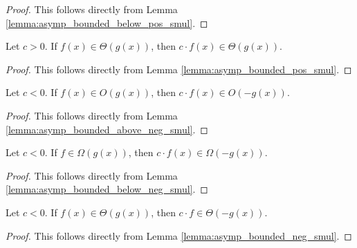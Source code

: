 \begin{proof}
    \leanok
    This follows directly from Lemma \ref{lemma:asymp_bounded_below_pos_smul}.
\end{proof}

\begin{lemma}
    \label{lemma:theta_pos_smul}
    \leanok
    Let $c > 0$. If $f(x) \in \Theta(g(x))$, then $c \cdot f(x) \in \Theta(g(x))$.
\end{lemma}

\begin{proof}
    \leanok
    This follows directly from Lemma \ref{lemma:asymp_bounded_pos_smul}.
\end{proof}

\begin{lemma}
    \label{lemma:big_o_neg_smul}
    \leanok
    Let $c < 0$. If $f(x) \in O(g(x))$, then $c \cdot f(x) \in O(-g(x))$.
\end{lemma}

\begin{proof}
    \leanok
    This follows directly from Lemma \ref{lemma:asymp_bounded_above_neg_smul}.
\end{proof}

\begin{lemma}
    \label{lemma:big_omega_neg_smul}
    \leanok
    Let $c < 0$. If $f \in \Omega(g(x))$, then $c \cdot f(x) \in \Omega(-g(x))$.
\end{lemma}

\begin{proof}
    \leanok
    This follows directly from Lemma \ref{lemma:asymp_bounded_below_neg_smul}.
\end{proof}

\begin{lemma}
    \label{lemma:theta_neg_smul}
    \leanok
    Let $c < 0$. If $f(x) \in \Theta(g(x))$, then $c \cdot f \in \Theta(-g(x))$.
\end{lemma}

\begin{proof}
    \leanok
    This follows directly from Lemma \ref{lemma:asymp_bounded_neg_smul}.
\end{proof}


